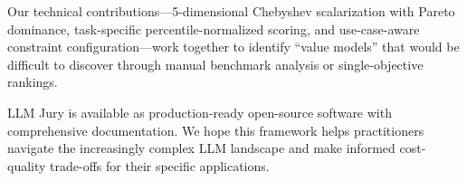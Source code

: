 \documentclass[11pt,a4paper]{article}
\begin{document}
Our technical contributions---5-dimensional Chebyshev scalarization with Pareto dominance, task-specific percentile-normalized scoring, and use-case-aware constraint configuration---work together to identify ``value models'' that would be difficult to discover through manual benchmark analysis or single-objective rankings.

LLM Jury is available as production-ready open-source software with comprehensive documentation. We hope this framework helps practitioners navigate the increasingly complex LLM landscape and make informed cost-quality trade-offs for their specific applications.



\end{document}

